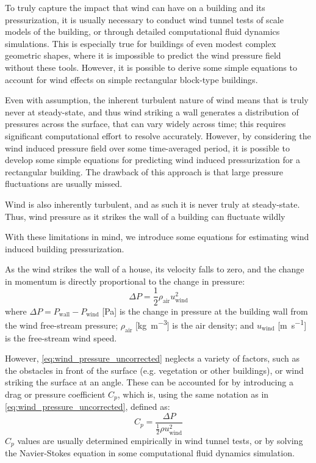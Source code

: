 To truly capture the impact that wind can have on a building and its pressurization, it is usually necessary to conduct wind tunnel tests of scale models of the building, or through detailed computational fluid dynamics simulations.
This is especially true for buildings of even modest complex geometric shapes, where it is impossible to predict the wind pressure field without these tools.
However, it is possible to derive some simple equations to account for wind effects on simple rectangular block-type buildings.\par

Even with assumption, the inherent turbulent nature of wind means that is truly never at steady-state, and thus wind striking a wall generates a distribution of pressures across the surface, that can vary widely across time; this requires significant computational effort to resolve accurately.
However, by considering the wind induced pressure field over some time-averaged period, it is possible to develop some simple equations for predicting wind induced pressurization for a rectangular building.
The drawback of this approach is that large pressure fluctuations are usually missed.\par


Wind is also inherently turbulent, and as such it is never truly at steady-state.
Thus, wind pressure as it strikes the wall of a building can fluctuate wildly





With these limitations in mind, we introduce some equations for estimating wind induced building pressurization.

As the wind strikes the wall of a house, its velocity falls to zero, and the change in momentum is directly proportional to the change in pressure:
\begin{equation}\label{eq:wind_pressure_uncorrected}
  \Delta P = \frac{1}{2} \rho_\mathrm{air} u_\mathrm{wind}^2
\end{equation}
where $\Delta P = P_\mathrm{wall} - P_\mathrm{wind}$ [\si{\pascal}] is the change in pressure at the building wall from the wind free-stream pressure;
$\rho_\mathrm{air}$ [\si{\kilo\gram\per\metre\cubed}] is the air density;
and $u_\mathrm{wind}$ [\si{\metre\per\second}] is the free-stream wind speed.\par

However, \eqref{eq:wind_pressure_uncorrected} neglects a variety of factors, such as the obstacles in front of the surface (e.g. vegetation or other buildings), or wind striking the surface at an angle.
These can be accounted for by introducing a drag or pressure coefficient $C_p$, which is, using the same notation as in \eqref{eq:wind_pressure_uncorrected}, defined as:
\begin{equation}
  C_p = \frac{\Delta P}{\frac{1}{2} \rho u^2_\mathrm{wind}}
\end{equation}
$C_p$ values are usually determined empirically in wind tunnel tests, or by solving the Navier-Stokes equation in some computational fluid dynamics simulation.\par

